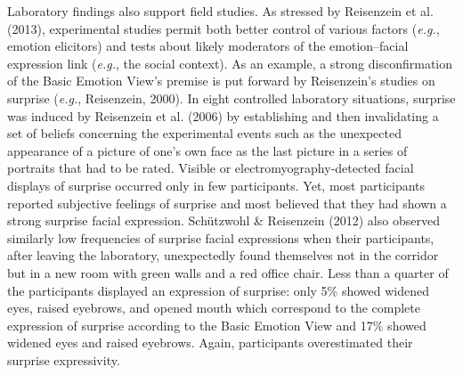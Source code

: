 \documentclass[
  english,
  man]{apa7}
\begin{document}
Laboratory findings also support field studies. As stressed by Reisenzein et al. (2013), experimental studies permit both better control of various factors (\emph{e.g.}, emotion elicitors) and tests about likely moderators of the emotion--facial expression link (\emph{e.g.}, the social context). As an example, a strong disconfirmation of the Basic Emotion View's premise is put forward by Reisenzein's studies on surprise (\emph{e.g.}, Reisenzein, 2000). In eight controlled laboratory situations, surprise was induced by Reisenzein et al. (2006) by establishing and then invalidating a set of beliefs concerning the experimental events such as the unexpected appearance of a picture of one's own face as the last picture in a series of portraits that had to be rated. Visible or electromyography-detected facial displays of surprise occurred only in few participants. Yet, most participants reported subjective feelings of surprise and most believed that they had shown a strong surprise facial expression. Schützwohl \& Reisenzein (2012) also observed similarly low frequencies of surprise facial expressions when their participants, after leaving the laboratory, unexpectedly found themselves not in the corridor but in a new room with green walls and a red office chair. Less than a quarter of the participants displayed an expression of surprise: only 5\% showed widened eyes, raised eyebrows, and opened mouth which correspond to the complete expression of surprise according to the Basic Emotion View and 17\% showed widened eyes and raised eyebrows. Again, participants overestimated their surprise expressivity.
\end{document}
